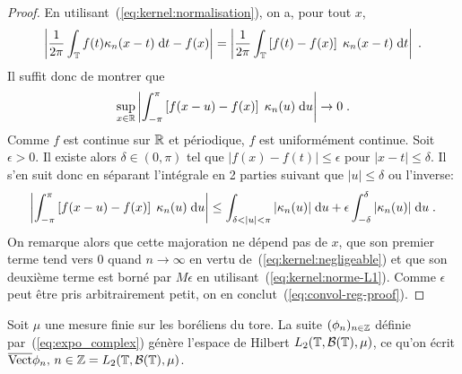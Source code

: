\begin{proof}\smartqed
  En utilisant~(\ref{eq:kernel:normalisation}), on a, pour tout $x$,
$$
\left|\frac{1}{2 \pi} \int_{\mathbb{T}} f(t) \kappa_n(x-t)\;  \mathrm{d} t - f(x)\right|
=\left|\frac{1}{2 \pi} \int_{\mathbb{T}} \left[f(t) - f(x)\right] \;\kappa_n(x-t)\;  \mathrm{d}
  t\right| \;.
$$
Il suffit donc de montrer que
\begin{equation}
\label{eq:convol-reg-proof}
\sup_{x\in\mathbb{R}}\left|\int_{-\pi}^{\pi}
\left[f(x-u) - f(x)\right] \;\kappa_n(u)\;  \mathrm{d} u\right|\to0\;.
\end{equation}
Comme $f$ est continue sur $\mathbb{R}$ et p\'{e}riodique, $f$ est uniform\'{e}ment
continue. Soit $\epsilon>0$. Il existe alors $\delta\in(0,\pi)$ tel que
$|f(x)-f(t)|\leq \epsilon$ pour $|x-t|\leq\delta$. Il s'en suit donc en
s\'{e}parant l'int\'{e}grale en 2 parties suivant que $|u|\leq\delta$ ou l'inverse:
$$
\left|\int_{-\pi}^{\pi}
\left[f(x-u) - f(x)\right] \;\kappa_n(u)\;  \rmd u\right|
\leq \int_{\delta<|u|<\pi} |\kappa_n(u)|\;  \rmd u
+ \epsilon\int_{-\delta}^\delta |\kappa_n(u)|\;  \rmd u \;.
$$
On remarque alors que cette majoration ne d\'{e}pend pas de $x$, que son premier
terme tend vers 0 quand $n\to\infty$ en vertu de~(\ref{eq:kernel:negligeable})
et que son deuxi\`{e}me terme est born\'{e} par $M\epsilon$ en
utilisant~(\ref{eq:kernel:norme-L1}). Comme $\epsilon$ peut \^{e}tre pris
arbitrairement petit, on en conclut~(\ref{eq:convol-reg-proof}).

\end{proof}
\begin{corollary}
Soit $\mu$ une mesure finie sur les bor\'{e}liens du tore.
La suite $(\phi_n)_{n\in\mathbb{Z}}$ d\'{e}finie par~(\ref{eq:expo_complex}) g\'{e}n\`{e}re
l'espace de Hilbert $L_2(\mathbb{T},\mathcal{B}(\mathbb{T}),\mu)$, ce qu'on \'{e}crit
$\overline{\mathrm{Vect}}{\phi_n,\,n\in\mathbb{Z}}=L_2(\mathbb{T},\mathcal{B}(\mathbb{T}),\mu)$.
\end{corollary}
